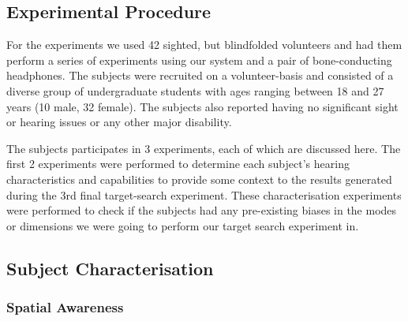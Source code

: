 \documentclass[format=sigconf, review=true, screen=true, anonymous=true]{acmart}
\begin{document}



\subsection{Experimental Procedure}

For the experiments we used 42 sighted, but blindfolded volunteers and had them perform a series of experiments using our system and a pair of bone-conducting headphones. The subjects were recruited on a volunteer-basis and consisted of a diverse group of undergraduate students with ages ranging between 18 and 27 years (10 male, 32 female). The subjects also reported having no significant sight or hearing issues or any other major disability. 

The subjects participates in 3 experiments, each of which are discussed here. The first 2 experiments were performed to determine each subject's hearing characteristics and capabilities to provide some context to the results generated during the 3rd final target-search experiment. These characterisation experiments were performed to check if the subjects had any pre-existing biases in the modes or dimensions we were going to perform our target search experiment in. 

\subsection{Subject Characterisation}

\subsubsection{Spatial Awareness}
\end{document}
